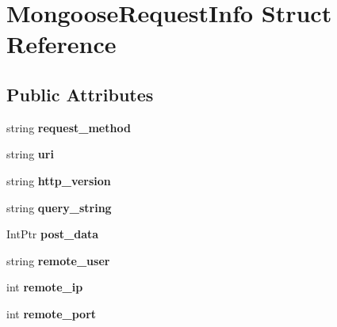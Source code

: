 \hypertarget{struct_mongoose_request_info}{\section{Mongoose\-Request\-Info Struct Reference}
\label{struct_mongoose_request_info}
}
\subsection*{Public Attributes}
\begin{DoxyCompactItemize}
\item 
\hypertarget{struct_mongoose_request_info_a2988d17312ff4f85e8b78edb63a83e46}{string {\bfseries request\-\_\-method}}\label{struct_mongoose_request_info_a2988d17312ff4f85e8b78edb63a83e46}

\item 
\hypertarget{struct_mongoose_request_info_a3f0c3e95ba7436180ab5937a35be5cb0}{string {\bfseries uri}}\label{struct_mongoose_request_info_a3f0c3e95ba7436180ab5937a35be5cb0}

\item 
\hypertarget{struct_mongoose_request_info_a4821b995059f981d411f658a18bd96a7}{string {\bfseries http\-\_\-version}}\label{struct_mongoose_request_info_a4821b995059f981d411f658a18bd96a7}

\item 
\hypertarget{struct_mongoose_request_info_acfbbce91c3683b8931b08d2582b9be19}{string {\bfseries query\-\_\-string}}\label{struct_mongoose_request_info_acfbbce91c3683b8931b08d2582b9be19}

\item 
\hypertarget{struct_mongoose_request_info_a73df254a98a3d33289344a6d628a3c87}{Int\-Ptr {\bfseries post\-\_\-data}}\label{struct_mongoose_request_info_a73df254a98a3d33289344a6d628a3c87}

\item 
\hypertarget{struct_mongoose_request_info_a81714db6d7e928193c8703d2f5718472}{string {\bfseries remote\-\_\-user}}\label{struct_mongoose_request_info_a81714db6d7e928193c8703d2f5718472}

\item 
\hypertarget{struct_mongoose_request_info_a772fd457a7acf7d2d322501d292f1347}{int {\bfseries remote\-\_\-ip}}\label{struct_mongoose_request_info_a772fd457a7acf7d2d322501d292f1347}

\item 
\hypertarget{struct_mongoose_request_info_af1bb31bea7497260d188ba1a05c6c5f1}{int {\bfseries remote\-\_\-port}}\label{struct_mongoose_request_info_af1bb31bea7497260d188ba1a05c6c5f1}


\end{DoxyCompactItemize}
